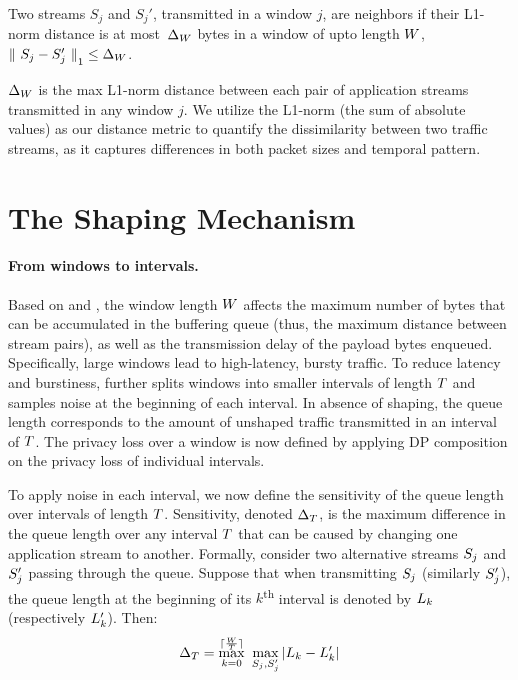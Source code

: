 \begin{definition}
Two streams $S_{j}$ and $S_{j}'$, transmitted in a window $j$,
are neighbors
if their L1-norm distance is at most~$\Delta_{W}$ bytes in a window of upto length $W$, \ie ${\|~S_{j} - S_{j}'~\|}_1 \leq \Delta_{W}$.
\label{def:neighboring-streams}
\end{definition}

$\Delta_{W}$ is the max L1-norm distance between each pair of application streams transmitted in any window $j$.
We utilize the L1-norm (the sum of absolute values) as our distance metric to quantify the dissimilarity between two traffic streams, as it captures differences in both packet sizes and temporal pattern.


\section{The Shaping Mechanism}
\label{subsec:dp-shaping-mechanism}
\paragraph{From windows to intervals.}
Based on  and , the window length $W$ affects the maximum number of bytes that can be accumulated in the buffering queue (thus, the maximum distance between stream pairs), as well as the transmission delay of the payload bytes enqueued.
Specifically, large windows lead to high-latency, bursty traffic.
To reduce latency and burstiness, {\sys} further splits windows into smaller intervals of length $T$ and samples noise at the beginning of each interval.
In absence of shaping, the queue length corresponds to the amount of unshaped traffic transmitted in an interval of $T$.
The privacy loss over a window is now defined by applying DP composition on the privacy loss of individual intervals.

To apply noise in each interval, we now define the sensitivity of the queue  length over intervals of length $T$.
Sensitivity, denoted $\Delta_T$, is the maximum difference in the queue length over any interval $T$ that can be caused by changing one application stream to another.
Formally, consider two alternative streams $S_{j}$ and $S_{j}'$ passing through the queue.
Suppose that when transmitting $S_{j}$ (similarly $S_{j}'$), the queue length at the beginning of its $k$\textsuperscript{th} interval is denoted by $L_{k}$ (respectively $L_{k}'$). Then:
\begin{equation}
    \Delta_T = \max_{k = 0}^{\lceil \frac{W}{T} \rceil}~\max_{S_{j},
        S_{j}'} | L_{k} - L_{k}' |
    \label{eqn:ssens}
\end{equation}


